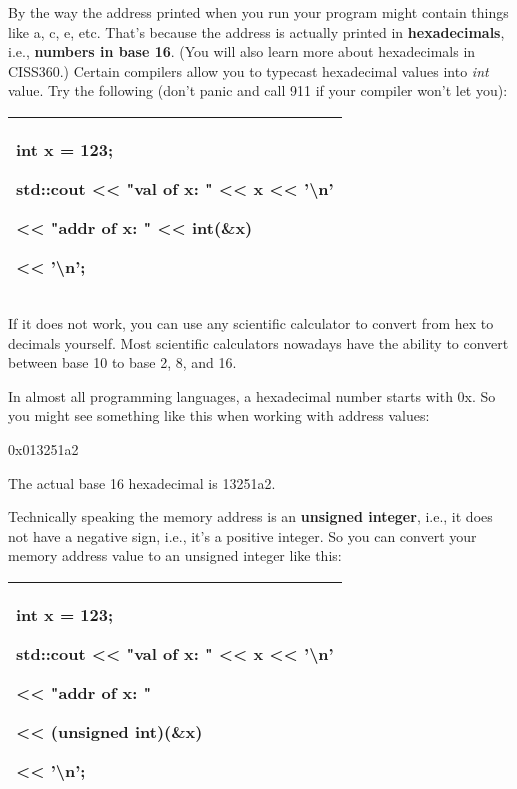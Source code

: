 \documentclass[
]{article}
\begin{document}
By the way the address printed when you run your program might contain
things like a, c, e, etc. That's because the address is actually printed
in \textbf{hexadecimals}, i.e., \textbf{numbers in base 16}. (You will
also learn more about hexadecimals in CISS360.) Certain compilers allow
you to typecast hexadecimal values into \emph{int} value. Try the
following (don't panic and call 911 if your compiler won't let you):

\begin{longtable}[]{@{}l@{}}
\toprule
\endhead
\begin{minipage}[t]{0.97\columnwidth}\raggedright
int x = 123;

std::cout \textless\textless{} "val of x: " \textless\textless{} x
\textless\textless{} '\textbackslash n'

\textless\textless{} "addr of x: " \textless\textless{}
\textbf{int(\&x)}

\textless\textless{} '\textbackslash n';\strut
\end{minipage}\tabularnewline
\bottomrule
\end{longtable}

If it does not work, you can use any scientific calculator to convert
from hex to decimals yourself. Most scientific calculators nowadays have
the ability to convert between base 10 to base 2, 8, and 16.

In almost all programming languages, a hexadecimal number starts with
0x. So you might see something like this when working with address
values:

0x013251a2

The actual base 16 hexadecimal is 13251a2.

Technically speaking the memory address is an \textbf{unsigned integer},
i.e., it does not have a negative sign, i.e., it's a positive integer.
So you can convert your memory address value to an unsigned integer like
this:

\begin{longtable}[]{@{}l@{}}
\toprule
\endhead
\begin{minipage}[t]{0.97\columnwidth}\raggedright
int x = 123;

std::cout \textless\textless{} "val of x: " \textless\textless{} x
\textless\textless{} '\textbackslash n'

\textless\textless{} "addr of x: "

\textless\textless{} \textbf{(unsigned int)(\&x)}

\textless\textless{} '\textbackslash n';\strut
\end{minipage}\tabularnewline
\bottomrule
\end{longtable}
\end{document}
